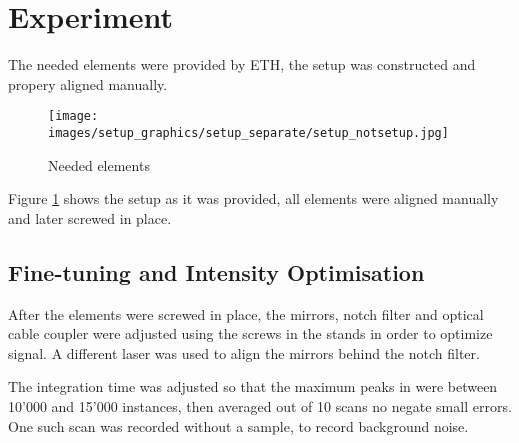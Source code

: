 \section{Experiment}

The needed elements were provided by ETH, the setup was constructed and propery aligned manually.

\begin{figure}[ht]
    \centering
    \texttt{[image: images/setup\_graphics/setup\_separate/setup\_notsetup.jpg]}
    \caption{Needed elements}
    \label{fig:setup_notsetup}
\end{figure}

Figure \ref{fig:setup_notsetup} shows the setup as it was provided, all elements were aligned manually and later screwed in place.


\subsection{Fine-tuning and Intensity Optimisation}

After the elements were screwed in place, the mirrors, notch filter and optical cable coupler were adjusted using the screws in the stands in order to optimize signal. A different laser was used to align the mirrors behind the notch filter.

\bigskip

The integration time was adjusted so that the maximum peaks in were between 10'000 and 15'000 instances, then averaged out of 10 scans no negate small errors. One such scan was recorded without a sample, to record background noise.